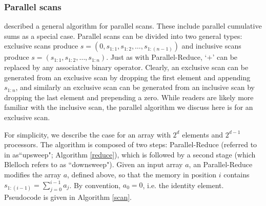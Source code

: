 {%




\subsubsection{Parallel scans}
\citet{blelloch1990} described a general algorithm for parallel scans. These include parallel cumulative sums as a special case. Parallel scans can be divided into two general types: exclusive scans produce $s=(0, s_{1:1}, s_{1:2}, \ldots, s_{1:(n-1)})$ and inclusive scans produce $s=(s_{1:1},s_{1:2},\ldots,s_{1:n})$. Just as with Parallel-Reduce, `$+$' can be replaced by any associative binary operator. 
 Clearly, an exclusive scan can be generated from an exclusive scan by dropping the first element and appending $s_{1:n}$, and similarly an exclusive scan can be generated from an inclusive scan by dropping the last element and prepending a zero. While readers are likely more familiar with the inclusive scan, the parallel algorithm we discuss here is for an exclusive scan.

For simplicity, we describe the case for an array with $2^d$ elements and $2^{d-1}$ processors. The algorithm is composed of two steps: Parallel-Reduce (referred to in \cite{blelloch1990} as``upsweep"; Algorithm \ref{reduce}), which is followed by a second stage (which Blelloch refers to as ``downsweep"). Given an input array $a$, an Parallel-Reduce modifies the array $a$, defined above, so that the memory in position $i$ contains $s_{1:(i-1)}=\sum_{j=0}^{i-1}a_j$. By convention, $a_0=0$, i.e. the identity element. Pseudocode is given in Algorithm \ref{scan}.

}
